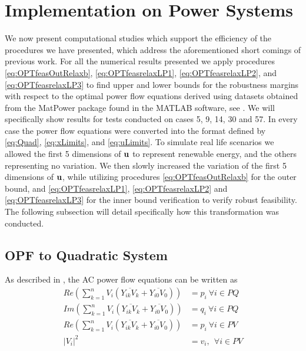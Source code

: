 \section{Implementation on Power Systems} \label{sec:numstd}  

We now present computational studies which support the efficiency of the procedures we have presented, which address the aforementioned short comings of previous work. 
For all the numerical results presented we apply procedures \eqref{eq:OPTfeasOutRelaxb}, \eqref{eq:OPTfeasrelaxLP1}, \eqref{eq:OPTfeasrelaxLP2}, and \eqref{eq:OPTfeasrelaxLP3} to find upper and lower bounds for the robustness margins with respect to the optimal power flow equations derived using datasets obtained from the MatPower package found in the MATLAB software, see \cite{matpower}. 
We will specifically show results for tests conducted on cases 5, 9, 14, 30 and 57. 
In every case the power flow equations were converted into the format defined by \eqref{eq:Quad}, \eqref{eq:xLimits}, and \eqref{eq:uLimits}. 
To simulate real life scenarios we allowed the first 5 dimensions of $\mathbf{u}$ to represent renewable energy, and the others representing no variation. We then slowly increased the variation of the first 5 dimensions of $\mathbf{u}$, while utilizing procedures \eqref{eq:OPTfeasOutRelaxb} for the outer bound, and \eqref{eq:OPTfeasrelaxLP1}, \eqref{eq:OPTfeasrelaxLP2} and \eqref{eq:OPTfeasrelaxLP3} for the inner bound verification to verify robust feasibility. 
The following subsection will detail specifically how this transformation was conducted.

\subsection{OPF to Quadratic System} \label{ssec:opf2qsys}

As described in \cite{DjTuritsyn}, the AC power flow equations can be written as 
\begin{equation}\label{eq:Real1}
	\begin{array}{rl}
	Re\left(\sum\limits_{k=1}^n V_i\left(\overline{Y_{ik}V_k} + \overline{Y_{i0}V_0}\right)\right) &= p_i \ \forall i\in PQ \\
	
	Im\left(\sum\limits_{k=1}^n V_i\left(\overline{Y_{ik}V_k} + \overline{Y_{i0}V_0}\right)\right) &= q_i \ \forall i\in PQ \\
	
	Re\left(\sum\limits_{k=1}^n V_i\left(\overline{Y_{ik}V_k} + \overline{Y_{i0}V_0}\right)\right) &= p_i \ \forall i\in PV \\ 
	
	|V_i|^2 &= v_i, \  \ \forall i \in PV 
	\end{array}
\end{equation}

